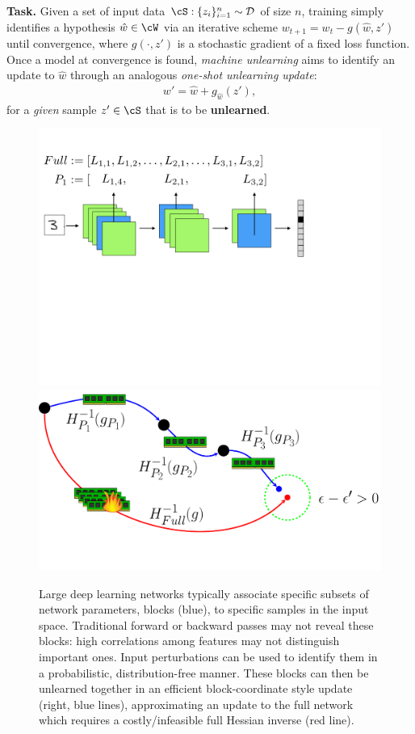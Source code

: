 \textbf{Task.} Given a set of input data $\cS: \{z_i\}_{i=1}^n \sim \mathcal{D}$ of size $n$, training simply identifies a hypothesis $\hat{w} \in \cW$  via an iterative scheme $w_{t+1} = w_t - g(\hat{w},z')$ until convergence, where $g(\cdot,z')$ is  a stochastic gradient of a fixed loss function. Once a model at convergence is found, \textit{machine unlearning} aims to identify an update to $\hat{w}$ through an analogous \textit{one-shot unlearning update}:
\begin{align}\label{eq:unlearn}
    w' = \hat{w} + g_{\hat{w}}\left(z'\right),
\end{align}
for a \textit{given} sample $z' \in \cS$ that is to be \textbf{unlearned}.

\begin{figure}
	\centering
	\includegraphics[width=0.48\columnwidth,trim={0cm 12cm 5cm 2.5cm},clip]{diss/5_unlearn/figs/layercnn.png}
	\includegraphics[width=0.48\columnwidth,trim={0cm 1cm 0cm 0cm},clip]{diss/5_unlearn/figs/unlearning_fig.pdf}
	\caption[Efficient Unlearning in Deep Networks]{\label{fig:main}Large deep learning networks typically associate specific subsets of network parameters, blocks (blue), to specific samples in the input space.
		Traditional forward or backward passes may not reveal these blocks: high correlations among features may not distinguish important ones. Input perturbations can be used to identify them in a probabilistic, distribution-free manner. These blocks can then be unlearned together in an efficient block-coordinate style update (right, blue lines), approximating an update to the full network which requires a costly/infeasible full Hessian inverse (red line).}
\end{figure}

